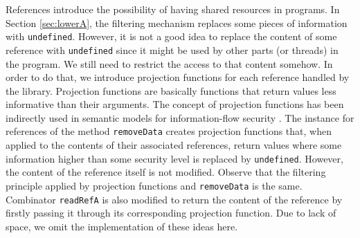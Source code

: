 \documentclass[times, 10pt,twocolumn]{article}
\begin{document}
References introduce the possibility of having shared resources 
in programs. In Section \ref{sec:lowerA}, the filtering mechanism  
replaces some pieces of information with \texttt{undefined}. 
However, it is not a good idea to replace the content of some reference
with \texttt{undefined} since it might be used by other parts (or
threads) in the program. We still need to restrict the access 
to that content somehow. In order to do that, we introduce 
projection functions for each reference handled by the library. 
Projection functions are basically functions that return 
values less informative than their arguments. 
The concept of projection functions has been indirectly used in semantic
models for information-flow security \cite{Hun91b,Sabelfeld:Sands:ESOP99}. 
The instance for references of the method \texttt{removeData} 
creates projection functions that, when applied to the 
contents of their associated references, return values 
where some information higher than some 
security level is replaced by \texttt{undefined}. 
However, the content of the reference itself is not modified. 
Observe that 
the filtering principle applied by projection functions and 
\texttt{removeData} is the same. 
Combinator \texttt{readRefA} is 
also modified to return the content of the reference by 
firstly passing it through its corresponding projection function.
Due to lack of space, we omit the implementation of these
ideas here.


\end{document}
